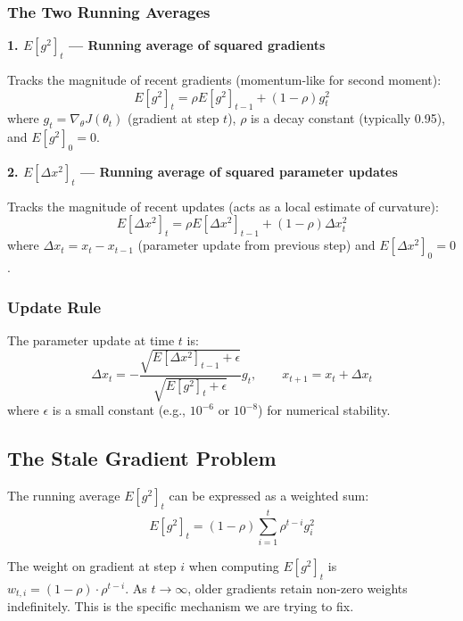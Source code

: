 \documentclass[11pt,a4paper]{article}
\begin{document}
\subsubsection{The Two Running Averages}

\textbf{1. $E[g^2]_t$ --- Running average of squared gradients}

Tracks the magnitude of recent gradients (momentum-like for second moment):
\begin{equation}
E[g^2]_t = \rho E[g^2]_{t-1} + (1-\rho) g_t^2
\end{equation}
where $g_t = \nabla_\theta J(\theta_t)$ (gradient at step $t$), $\rho$ is a decay constant (typically 0.95), and $E[g^2]_0 = 0$.

\textbf{2. $E[\Delta x^2]_t$ --- Running average of squared parameter updates}

Tracks the magnitude of recent updates (acts as a local estimate of curvature):
\begin{equation}
E[\Delta x^2]_t = \rho E[\Delta x^2]_{t-1} + (1-\rho) \Delta x_t^2
\end{equation}
where $\Delta x_t = x_t - x_{t-1}$ (parameter update from previous step) and $E[\Delta x^2]_0 = 0$.

\subsubsection{Update Rule}

The parameter update at time $t$ is:
\begin{equation}
\Delta x_t = - \frac{\sqrt{E[\Delta x^2]_{t-1} + \epsilon}}{\sqrt{E[g^2]_t + \epsilon}} g_t, \qquad x_{t+1} = x_t + \Delta x_t
\end{equation}
where $\epsilon$ is a small constant (e.g., $10^{-6}$ or $10^{-8}$) for numerical stability.

\subsection{The Stale Gradient Problem}

The running average $E[g^2]_t$ can be expressed as a weighted sum:
\begin{equation}
E[g^2]_t = (1-\rho) \sum_{i=1}^t \rho^{t-i} g_i^2
\end{equation}

The weight on gradient at step $i$ when computing $E[g^2]_t$ is $w_{t,i} = (1-\rho) \cdot \rho^{t-i}$. As $t \rightarrow \infty$, older gradients retain non-zero weights indefinitely. This is the specific mechanism we are trying to fix.
\end{document}
